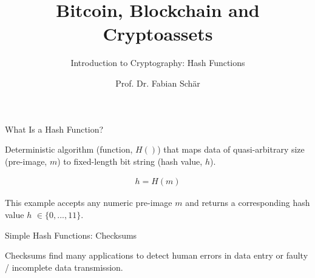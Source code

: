 \documentclass[handout]{beamer}
\title{Bitcoin, Blockchain and Cryptoassets}
\subtitle{Introduction to Cryptography: Hash Functions}
\author{Prof. Dr. Fabian Schär}
\institute{University of Basel}
\begin{document}
\thispagestyle{empty}
\begin{frame}[noframenumbering]
	\titlepage
\end{frame}

\begin{frame}{What Is a Hash Function?}

Deterministic algorithm (\color{focus}function, $H()$\color{black}) that maps data of quasi-arbitrary size (\color{focus}pre-image, $m$\color{black}) to fixed-length bit string (\color{focus}hash value, $h$\color{black}).

	\begin{align}
		h = H(m)
		\label{eq:hash_function}
	\end{align}
	\vspace{1em}
	

This example accepts any numeric pre-image $m$ and returns a corresponding hash value $h$ $\in \{0,...,11\}$.
	
\end{frame}


\begin{frame}{Simple Hash Functions: Checksums}

Checksums find many applications to detect human errors in data entry or faulty / incomplete data transmission.

\vspace{1em} 
	
\end{frame}
\end{document}

